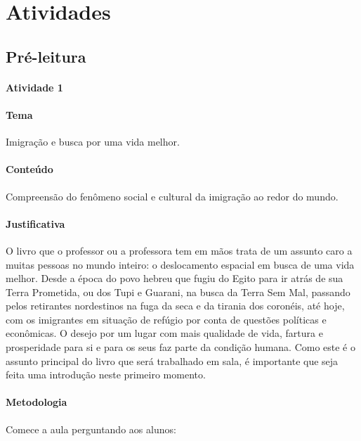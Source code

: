 \documentclass[11pt]{extarticle}
\begin{document}
\section{Atividades}

\subsection{Pré-leitura}


\paragraph{Atividade 1}

\paragraph{Tema} Imigração e busca por uma vida melhor.

\paragraph{Conteúdo} Compreensão do fenômeno social e cultural da imigração ao redor
do mundo.

\paragraph{Justificativa} O livro que o professor ou a professora tem em mãos trata de um assunto caro a muitas pessoas no mundo inteiro: o deslocamento espacial em busca de uma vida melhor. Desde a época do povo hebreu que fugiu do Egito para
ir atrás de sua Terra Prometida, ou dos Tupi e Guarani, na busca da Terra Sem Mal, passando pelos retirantes 
nordestinos na fuga da seca e da tirania dos coronéis, até hoje, com os imigrantes em situação de refúgio por 
conta de questões políticas e econômicas. O desejo por um lugar com mais qualidade de vida, fartura e prosperidade 
para si e para os seus faz parte da condição humana. Como este é o assunto principal do livro que será trabalhado em sala, é importante que seja feita
uma introdução neste primeiro momento. 


\paragraph{Metodologia} Comece a aula perguntando aos alunos:
\end{document}
